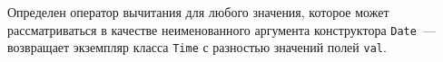 Определен оператор вычитания для любого значения, которое может рассматриваться
в качестве неименованного аргумента конструктора {\tt Date}~--- возвращает
экземпляр класса {\tt Time} с разностью значений полей {\tt val}. 
\fi
